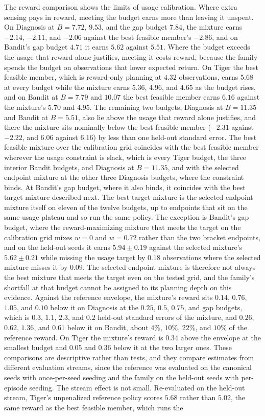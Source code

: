 The reward comparison shows the limits of usage calibration. Where extra sensing pays in reward, meeting the budget earns more than leaving it unspent. On Diagnosis at $B{=}7.72$, $9.53$, and the gap budget $7.84$, the mixture earns $-2.14$, $-2.11$, and $-2.06$ against the best feasible member's $-2.86$, and on Bandit's gap budget $4.71$ it earns $5.62$ against $5.51$. Where the budget exceeds the usage that reward alone justifies, meeting it costs reward, because the family spends the budget on observations that lower expected return. On Tiger the best feasible member, which is reward-only planning at $4.32$ observations, earns $5.68$ at every budget while the mixture earns $5.36$, $4.96$, and $4.65$ as the budget rises, and on Bandit at $B{=}7.79$ and $10.07$ the best feasible member earns $6.16$ against the mixture's $5.70$ and $4.95$. The remaining two budgets, Diagnosis at $B{=}11.35$ and Bandit at $B{=}5.51$, also lie above the usage that reward alone justifies, and there the mixture sits nominally below the best feasible member ($-2.31$ against $-2.22$, and $6.06$ against $6.16$) by less than one held-out standard error. The best feasible mixture over the calibration grid coincides with the best feasible member wherever the usage constraint is slack, which is every Tiger budget, the three interior Bandit budgets, and Diagnosis at $B{=}11.35$, and with the selected endpoint mixture at the other three Diagnosis budgets, where the constraint binds. At Bandit's gap budget, where it also binds, it coincides with the best target mixture described next. The best target mixture is the selected endpoint mixture itself on eleven of the twelve budgets, up to endpoints that sit on the same usage plateau and so run the same policy. The exception is Bandit's gap budget, where the reward-maximizing mixture that meets the target on the calibration grid mixes $w{=}0$ and $w{=}0.72$ rather than the two bracket endpoints, and on the held-out seeds it earns $5.94 \pm 0.19$ against the selected mixture's $5.62 \pm 0.21$ while missing the usage target by $0.18$ observations where the selected mixture misses it by $0.09$. The selected endpoint mixture is therefore not always the best mixture that meets the target even on the tested grid, and the family's shortfall at that budget cannot be assigned to its planning depth on this evidence. Against the reference envelope, the mixture's reward sits $0.14$, $0.76$, $1.05$, and $0.10$ below it on Diagnosis at the $0.25$, $0.5$, $0.75$, and gap budgets, which is $0.3$, $1.1$, $2.3$, and $0.2$ held-out standard errors of the mixture, and $0.26$, $0.62$, $1.36$, and $0.61$ below it on Bandit, about $4\%$, $10\%$, $22\%$, and $10\%$ of the reference reward. On Tiger the mixture's reward is $0.34$ above the envelope at the smallest budget and $0.05$ and $0.36$ below it at the two larger ones. These comparisons are descriptive rather than tests, and they compare estimates from different evaluation streams, since the reference was evaluated on the canonical seeds with once-per-seed seeding and the family on the held-out seeds with per-episode seeding. The stream effect is not small. Re-evaluated on the held-out stream, Tiger's unpenalized reference policy scores $5.68$ rather than $5.02$, the same reward as the best feasible member, which runs the 